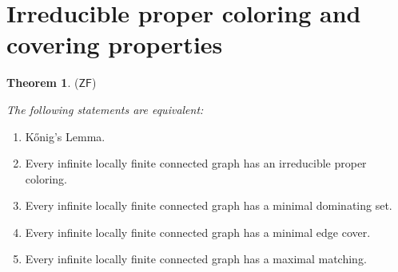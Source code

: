 \documentclass[12pt,reqno,a4paper]{amsart}
\theoremstyle{definition}
\newtheorem{thm}[defn]{Theorem}
\begin{document}
	\section{Irreducible proper coloring and covering properties}
	\begin{thm}{($\mathsf{ZF}$)}{\em The following statements are equivalent:
			\begin{enumerate}
				\item K\H{o}nig’s Lemma.
				\item Every infinite locally finite connected graph has an irreducible proper coloring.
				
				\item Every infinite locally finite connected graph has a minimal dominating set. 
				
				\item Every infinite locally finite connected graph has a minimal edge cover.
				
				\item Every infinite locally finite connected graph has a maximal matching.
			\end{enumerate}
		}
	\end{thm}
	
\end{document}
